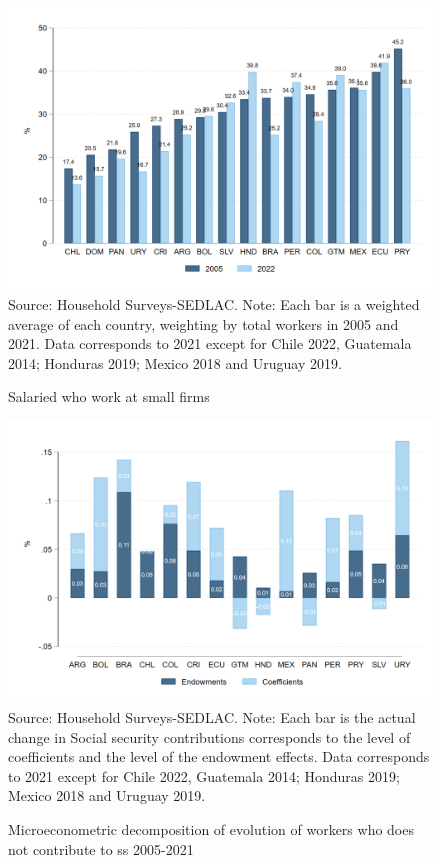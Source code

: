 \documentclass[english]{article}
\begin{document}
\begin{itemize}
\begin{figure}[!htb]
    \justifying
     \caption{Salaried who work at small firms}     
     \includegraphics[scale=.3]{latex/figures/Snapshot/snapshot_dependents_small.png}
    \label{fig:SalariedSmall}
    \footnotesize{Source: Household Surveys-SEDLAC.}
    \footnotesize{Note: Each bar is a weighted average of each country, weighting by total workers in 2005 and 2021.  Data corresponds to 2021 except for Chile 2022, Guatemala 2014; Honduras 2019; Mexico 2018 and Uruguay 2019.}
\end{figure}


\begin{figure}[!htb]
        \justifying
        \caption{Microeconometric decomposition of evolution of workers who does not contribute to ss 2005-2021}     
        \includegraphics[scale=.3]{latex/figures/Snapshot/Oaxaca decomposition level.png}
        \label{fig:Oaxaca_level}
        \footnotesize{Source: Household Surveys-SEDLAC.}
        \footnotesize{Note: Each bar is the actual change in Social security contributions corresponds to the level of coefficients and the level of the endowment effects.  Data corresponds to 2021 except for Chile 2022, Guatemala 2014; Honduras 2019; Mexico 2018 and Uruguay 2019.}
 \end{figure}




\end{itemize}
\end{document}
